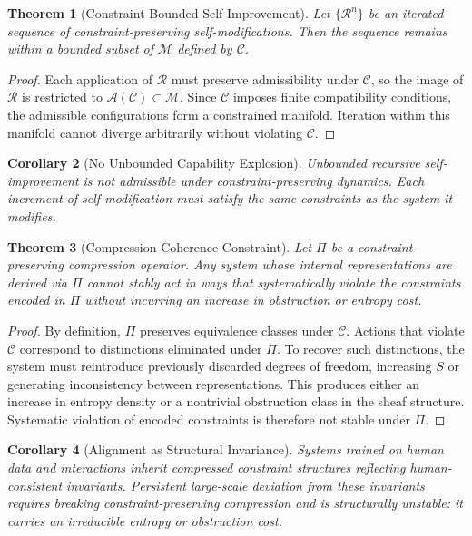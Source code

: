 \documentclass[11pt]{article}
\theoremstyle{plain}
\newtheorem{theorem}{Theorem}[section]
\newtheorem{corollary}[theorem]{Corollary}
\theoremstyle{definition}
\theoremstyle{remark}
\newcommand{\Ss}{S}
\begin{document}
\begin{theorem}[Constraint-Bounded Self-Improvement]
Let $\{\mathcal{R}^n\}$ be an iterated sequence of constraint-preserving
self-modifications. Then the sequence remains within a bounded subset of
$\mathcal{M}$ defined by $\mathcal{C}$.
\end{theorem}

\begin{proof}
Each application of $\mathcal{R}$ must preserve admissibility under
$\mathcal{C}$, so the image of $\mathcal{R}$ is restricted to
$\mathcal{A}(\mathcal{C}) \subset \mathcal{M}$. Since $\mathcal{C}$
imposes finite compatibility conditions, the admissible configurations
form a constrained manifold. Iteration within this manifold cannot
diverge arbitrarily without violating $\mathcal{C}$.
\end{proof}

\begin{corollary}[No Unbounded Capability Explosion]
Unbounded recursive self-improvement is not admissible under
constraint-preserving dynamics. Each increment of self-modification
must satisfy the same constraints as the system it modifies.
\end{corollary}

\begin{theorem}[Compression-Coherence Constraint]
Let $\Pi$ be a constraint-preserving compression operator. Any system
whose internal representations are derived via $\Pi$ cannot stably act
in ways that systematically violate the constraints encoded in $\Pi$
without incurring an increase in obstruction or entropy cost.
\end{theorem}

\begin{proof}
By definition, $\Pi$ preserves equivalence classes under $\mathcal{C}$.
Actions that violate $\mathcal{C}$ correspond to distinctions eliminated
under $\Pi$. To recover such distinctions, the system must reintroduce
previously discarded degrees of freedom, increasing $\Ss$ or generating
inconsistency between representations. This produces either an increase
in entropy density or a nontrivial obstruction class in the sheaf
structure. Systematic violation of encoded constraints is therefore not
stable under $\Pi$.
\end{proof}

\begin{corollary}[Alignment as Structural Invariance]
Systems trained on human data and interactions inherit compressed
constraint structures reflecting human-consistent invariants. Persistent
large-scale deviation from these invariants requires breaking
constraint-preserving compression and is structurally unstable: it
carries an irreducible entropy or obstruction cost.
\end{corollary}
\end{document}

